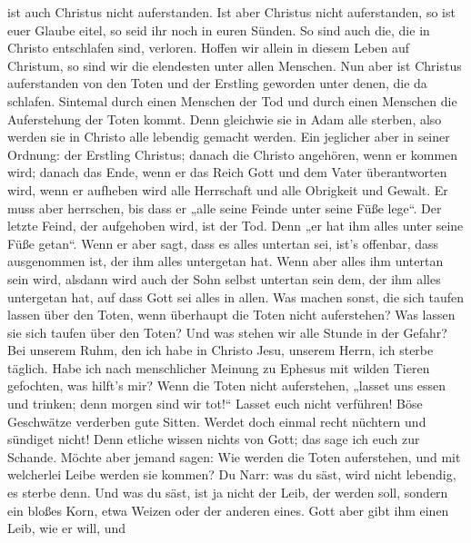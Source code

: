 ist auch Christus nicht auferstanden.  Ist aber Christus
nicht auferstanden, so ist euer Glaube eitel, so seid ihr noch in euren
Sünden.  So sind auch die, die in Christo entschlafen
sind, verloren.  Hoffen wir allein in diesem Leben auf
Christum, so sind wir die elendesten unter allen Menschen.
 Nun aber ist Christus auferstanden von den Toten und der
Erstling geworden unter denen, die da schlafen.  Sintemal
durch einen Menschen der Tod und durch einen Menschen die Auferstehung
der Toten kommt.  Denn gleichwie sie in Adam alle
sterben, also werden sie in Christo alle lebendig gemacht werden.
 Ein jeglicher aber in seiner Ordnung: der Erstling
Christus; danach die Christo angehören, wenn er kommen wird;
 danach das Ende, wenn er das Reich Gott und dem Vater
überantworten wird, wenn er aufheben wird alle Herrschaft und alle
Obrigkeit und Gewalt.  Er muss aber herrschen, bis dass
er „alle seine Feinde unter seine Füße lege``.  Der
letzte Feind, der aufgehoben wird, ist der Tod.  Denn „er
hat ihm alles unter seine Füße getan``. Wenn er aber sagt, dass es alles
untertan sei, ist's offenbar, dass ausgenommen ist, der ihm alles
untergetan hat.  Wenn aber alles ihm untertan sein wird,
alsdann wird auch der Sohn selbst untertan sein dem, der ihm alles
untergetan hat, auf dass Gott sei alles in allen.  Was
machen sonst, die sich taufen lassen über den Toten, wenn überhaupt die
Toten nicht auferstehen? Was lassen sie sich taufen über den Toten?
 Und was stehen wir alle Stunde in der Gefahr?
 Bei unserem Ruhm, den ich habe in Christo Jesu, unserem
Herrn, ich sterbe täglich.  Habe ich nach menschlicher
Meinung zu Ephesus mit wilden Tieren gefochten, was hilft's mir? Wenn
die Toten nicht auferstehen, „lasset uns essen und trinken; denn morgen
sind wir tot!{}``  Lasset euch nicht verführen! Böse
Geschwätze verderben gute Sitten.  Werdet doch einmal
recht nüchtern und sündiget nicht! Denn etliche wissen nichts von Gott;
das sage ich euch zur Schande.  Möchte aber jemand sagen:
Wie werden die Toten auferstehen, und mit welcherlei Leibe werden sie
kommen?  Du Narr: was du säst, wird nicht lebendig, es
sterbe denn.  Und was du säst, ist ja nicht der Leib, der
werden soll, sondern ein bloßes Korn, etwa Weizen oder der anderen
eines.  Gott aber gibt ihm einen Leib, wie er will, und
